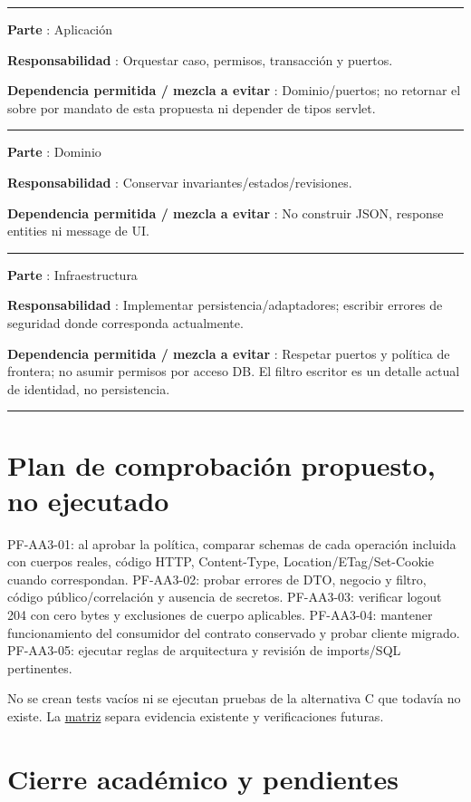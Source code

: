 \documentclass[12pt,a4paper]{report}
\begin{document}
\medskip\hrule\medskip

\textbf{Parte }: Aplicación

\textbf{Responsabilidad }: Orquestar caso, permisos, transacción y
puertos.

\textbf{Dependencia permitida / mezcla a evitar }: Dominio/puertos; no
retornar el sobre por mandato de esta propuesta ni depender de tipos
servlet.

\medskip\hrule\medskip

\textbf{Parte }: Dominio

\textbf{Responsabilidad }: Conservar invariantes/estados/revisiones.

\textbf{Dependencia permitida / mezcla a evitar }: No construir JSON,
response entities ni message de UI.

\medskip\hrule\medskip

\textbf{Parte }: Infraestructura

\textbf{Responsabilidad }: Implementar persistencia/adaptadores;
escribir errores de seguridad donde corresponda actualmente.

\textbf{Dependencia permitida / mezcla a evitar }: Respetar puertos y
política de frontera; no asumir permisos por acceso DB. El filtro
escritor es un detalle actual de identidad, no persistencia.

\medskip\hrule\medskip

\section{Plan de comprobación propuesto, no
ejecutado}\label{analisis-plan-de-comprobaciuxf3n-propuesto-no-ejecutado}

PF-AA3-01: al aprobar la política, comparar schemas de cada operación
incluida con cuerpos reales, código HTTP, Content-Type,
Location/ETag/Set-Cookie cuando correspondan. PF-AA3-02: probar errores
de DTO, negocio y filtro, código público/correlación y ausencia de
secretos. PF-AA3-03: verificar logout 204 con cero bytes y exclusiones
de cuerpo aplicables. PF-AA3-04: mantener funcionamiento del consumidor
del contrato conservado y probar cliente migrado. PF-AA3-05: ejecutar
reglas de arquitectura y revisión de imports/SQL pertinentes.

No se crean tests vacíos ni se ejecutan pruebas de la alternativa C que
todavía no existe. La \href{TRAZABILIDAD_ADR.md}{matriz} separa
evidencia existente y verificaciones futuras.

\section{Cierre académico y
pendientes}\label{analisis-cierre-acaduxe9mico-y-pendientes}
\end{document}
